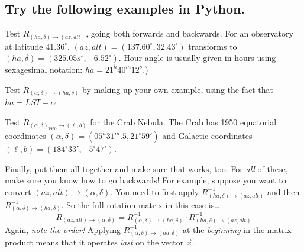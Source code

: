 \documentclass[]{article}
\begin{document}
\subsection {Try the following examples in Python.}

Test ${R}_{(ha, \delta) \rightarrow (az, alt)}$, going both forwards
and backwards. For an observatory at latitude $41.36^\circ$,
$(az,alt)=(137.60^\circ,32.43^\circ)$ transforms to
$(ha,\delta)=(325.05s^\circ, -6.52^\circ)$.  Hour angle is usually given
in hours using sexagesimal notation: $ha=21^h40^m12^{s}$.) 


    Test ${R}_{(\alpha, \delta) \rightarrow (ha, \delta)}$ by
making up your own example, using the fact that $ha = LST - \alpha$. 

    Test ${R}_{(\alpha, \delta)_{1950} \rightarrow (\ell, b)}$
for the Crab Nebula. The Crab has 1950
equatorial coordinates $(\alpha, \delta)=(05^h31^m.5, 21^\circ59')$ and
Galactic coordinates $(\ell,b)=(184^\circ33', -5^\circ47')$.

    Finally, put them all together and make sure that works, too. 
For {\it all} of these, make sure you know how to go backwards! For
example, suppose you want to convert $(az, alt) \rightarrow (\alpha,
\delta)$.  You need to first apply ${R}_{(ha, \delta) \rightarrow
(az, alt)}^{-1}$ and then ${R}_{(\alpha, \delta) \rightarrow (ha,
\delta)}^{-1}$.  So the full rotation matrix in this case is\dots
\begin{equation}
{R}_{(az, alt) \rightarrow (\alpha, \delta)} = 
{R}_{(\alpha, \delta) \rightarrow (ha, \delta)}^{-1} \cdot
{R}_{(ha, \delta) \rightarrow (az, alt)}^{-1}
\end{equation}
\noindent Again, {\it note the order!} Applying ${R}_{(\alpha,
\delta) \rightarrow (ha, \delta)}^{-1}$ at the {\it beginning} in the
matrix product means that it operates {\it last} on the vector ${\vec x}$. 

%
%
\end{document}
